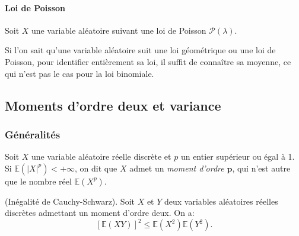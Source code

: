 \paragraph{Loi de Poisson} Soit $X$ une variable aléatoire suivant une loi de Poisson $\mathcal{P}(\lambda)$.\pl{\rep{4cm}}

\begin{remark}
	Si l'on sait qu'une variable aléatoire suit une loi géométrique ou une loi de Poisson, pour identifier entièrement sa loi, il suffit de connaître sa moyenne, ce qui n'est pas le cas pour la loi binomiale.
\end{remark}
\sld{\vfill\pagebreak[5]}%
\subsection{Moments d'ordre deux et variance}

\subsubsection{Généralités}


 
\begin{definition}
	Soit $X$ une variable aléatoire réelle discrète et $p$ un entier supérieur ou égal à 1. Si $\mathbb{E} (|X|^p) < + \infty$, on dit que $X$ admet un \emph{moment d'ordre} $\boldsymbol{p}$, qui n'est autre que le nombre réel $\mathbb{E} (X^p)$. 
\end{definition}
\sld{\vfill\pagebreak[5]}%
\begin{proposition} (Inégalité de Cauchy-Schwarz).
Soit $X$ et $Y$ deux variables aléatoires réelles discrètes admettant un moment d'ordre deux. On a:
$$  [\mathbb{E} (X Y)]^2 \leq\mathbb{E} (X^2) \mathbb{E} (Y^2). $$
\end{proposition}

